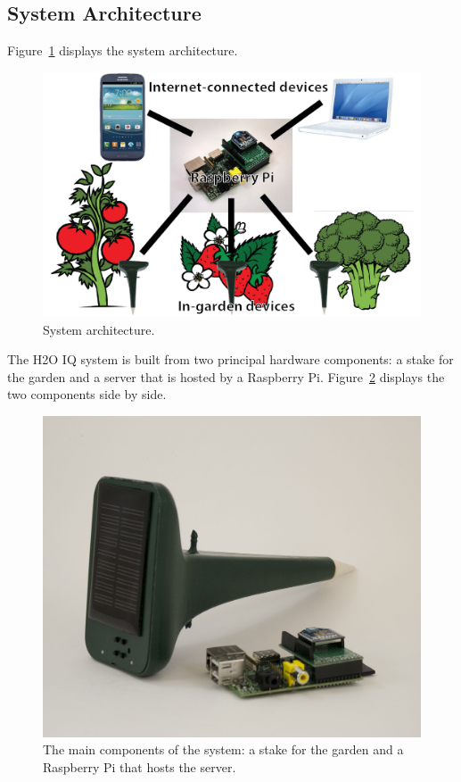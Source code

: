 \documentclass[11pt]{article}
\begin{document}
\subsection{System Architecture}

Figure~\ref{fig:architecture} displays the system architecture.

\begin{figure}[h]
\begin{center}
\includegraphics[scale=0.7]{./pngs/architecture.png}
\end{center}
\caption{System architecture.}
\label{fig:architecture}
\end{figure}

The H2O IQ system is built from two principal hardware components: a stake for the garden and a server that is hosted by a Raspberry Pi. Figure~\ref{fig:device} displays the two components side by side.

\begin{figure}[h]
\begin{center}
\includegraphics[scale=0.15]{./pngs/device.jpg}
\end{center}
\caption{The main components of the system: a stake for the garden and a Raspberry Pi that hosts the server.}
\label{fig:device}
\end{figure}
\end{document}

